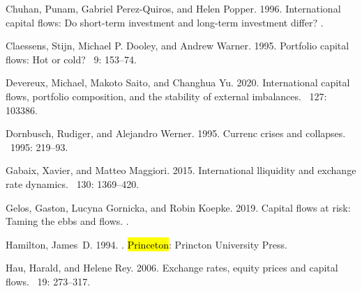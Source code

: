 \documentclass[jrfm,article,accept,moreauthors,pdftex]{Definitions/mdpi}
\begin{document}
\begin{thebibliography}{999}
Chuhan, Punam, Gabriel Perez-Quiros, and Helen Popper. 1996.
\newblock International capital flows: Do short-term investment and long-term
  investment differ?
.%

Claessens, Stijn, Michael P. Dooley, and Andrew Warner. 1995.
\newblock Portfolio capital flows: Hot or cold?
~{9}: 153--74.

Devereux, Michael, Makoto Saito, and Changhua Yu. 2020.
\newblock International capital flows, portfolio composition, and the stability
  of external imbalances.
~{127}: 103386.

Dornbusch, Rudiger, and Alejandro Werner. 1995.
\newblock Currenc crises and collapses.
~{1995}: 219--93.

Gabaix, Xavier, and Matteo Maggiori. 2015.
\newblock International lliquidity and exchange rate dynamics.
~{130}: 1369--420.

Gelos, Gaston, Lucyna Gornicka, and Robin Koepke. 2019.
\newblock Capital flows at risk: Taming the ebbs and flows.
.%

Hamilton, James~D. 1994.
.
\newblock \hl{Princeton}: Princton University Press. %

Hau, Harald, and Helene Rey. 2006.
\newblock Exchange rates, equity prices and capital flows.
~{19}: 273--317.


\end{thebibliography}
\end{document}
